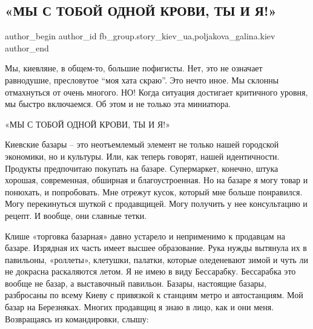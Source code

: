  
 
 
 
 
 
\subsection{«МЫ С ТОБОЙ ОДНОЙ КРОВИ, ТЫ И Я!»}
\label{sec:27_12_2021.fb.fb_group.story_kiev_ua.1.odnoj_krovi_ty_i_ja}
 
\ifcmt
 author_begin
   author_id fb_group.story_kiev_ua,poljakova_galina.kiev
 author_end
\fi

Мы, киевляне, в общем-то, большие пофигисты. Нет, это не означает равнодушие,
пресловутое \enquote{моя хата скраю}. Это нечто иное. Мы склонны отмахнуться от очень
многого. НО! Когда ситуация достигает критичного уровня, мы быстро включаемся.
Об этом и не только эта миниатюра. 

«МЫ С ТОБОЙ ОДНОЙ КРОВИ, ТЫ И Я!»

Киевские базары – это неотъемлемый элемент не только нашей городской экономики,
но и культуры. Или, как теперь говорят, нашей идентичности. Продукты
предпочитаю покупать на базаре. Супермаркет, конечно, штука хорошая,
современная, обширная и благоустроенная. Но на базаре я могу товар и понюхать,
и попробовать. Мне отрежут кусок, который мне больше понравился. Могу
перекинуться шуткой с продавщицей. Могу получить у нее консультацию и рецепт. И
вообще, они славные тетки. 

Клише «торговка базарная» давно устарело и неприменимо к продавцам на базаре.
Изрядная их часть имеет высшее образование. Рука нужды вытянула их в павильоны,
«роллеты», клетушки, палатки, которые оледеневают зимой и чуть ли не докрасна
раскаляются летом. Я не имею в виду Бессарабку. Бессарабка это вообще не базар,
а выставочный павильон. Базары, настоящие базары, разбросаны по всему Киеву с
привязкой к станциям метро и автостанциям. Мой базар на Березняках. Многих
продавщиц я знаю в лицо, как и они меня. Возвращаясь из командировки, слышу:

